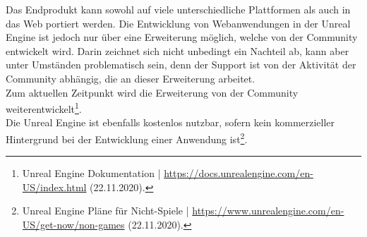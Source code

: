 \documentclass[a4paper,12pt,oneside]{article}
\begin{document}
        Das Endprodukt kann sowohl auf viele unterschiedliche Plattformen 
        als auch in das Web portiert werden. Die Entwicklung von Webanwendungen
        in der Unreal Engine ist jedoch nur über eine Erweiterung möglich, welche von 
        der Community entwickelt wird. Darin zeichnet sich nicht unbedingt ein Nachteil ab, 
        kann aber unter Umständen problematisch sein, denn der Support ist von der Aktivität 
        der Community abhängig, die an dieser Erweiterung arbeitet. \\
        Zum aktuellen Zeitpunkt wird die Erweiterung von der Community weiterentwickelt\footnote{Unreal Engine Dokumentation | \url{https://docs.unrealengine.com/en-US/index.html} (22.11.2020).}. \\
        Die Unreal Engine ist ebenfalls kostenlos nutzbar, sofern kein kommerzieller
        Hintergrund bei der Entwicklung einer Anwendung ist\footnote{Unreal Engine Pläne für Nicht-Spiele | \url{https://www.unrealengine.com/en-US/get-now/non-games} (22.11.2020).}.
\end{document}
